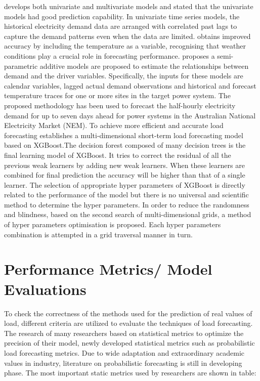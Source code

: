 \documentclass[mstat,12pt]{unswthesis}
\begin{document}
\cite{taylor2009forecasting} develops both univariate and multivariate
models and stated that the univariate models had good prediction
capability. In univariate time series models, the historical electricity
demand data are arranged with correlated past lags to capture the demand
patterns even when the data are limited. \cite{mcculloch2001forecasting}
obtains improved accuracy by including the temperature as a variable,
recognising that weather conditions play a crucial role in forecasting
performance. \cite{Fan2012} proposes a semi-parametric additive models
are proposed to estimate the relationships between demand and the driver
variables. Specifically, the inputs for these models are calendar
variables, lagged actual demand observations and historical and forecast
temperature traces for one or more sites in the target power system. The
proposed methodology has been used to forecast the half-hourly
electricity demand for up to seven days ahead for power systems in the
Australian National Electricity Market (NEM). To achieve more efficient
and accurate load forecasting \cite{Suo} establishes a multi-dimensional
short-term load forecasting model based on XGBoost.The decision forest
composed of many decision trees is the final learning model of XGBoost.
It tries to correct the residual of all the previous weak learners by
adding new weak learners. When these learners are combined for final
prediction the accuracy will be higher than that of a single learner.
The selection of appropriate hyper parameters of XGBoost is directly
related to the performance of the model but there is no universal and
scientific method to determine the hyper parameters. In order to reduce
the randomness and blindness, based on the second search of
multi-dimensional grids, a method of hyper parameters optimisation is
proposed. Each hyper parameters combination is attempted in a grid
traversal manner in turn.

\section{Performance Metrics/ Model
Evaluations}\label{performance-metrics-model-evaluations}

To check the correctness of the methods used for the prediction of real
values of load, different criteria are utilized to evaluate the
techniques of load forecasting. The research of many researchers based
on statistical metrics to optimize the precision of their model, newly
developed statistical metrics such as probabilistic load forecasting
metrics. Due to wide adaptation and extraordinary academic values in
industry, literature on probabilistic forecasting is still in developing
phase. The most important static metrics used by researchers are shown
in table:
\end{document}
